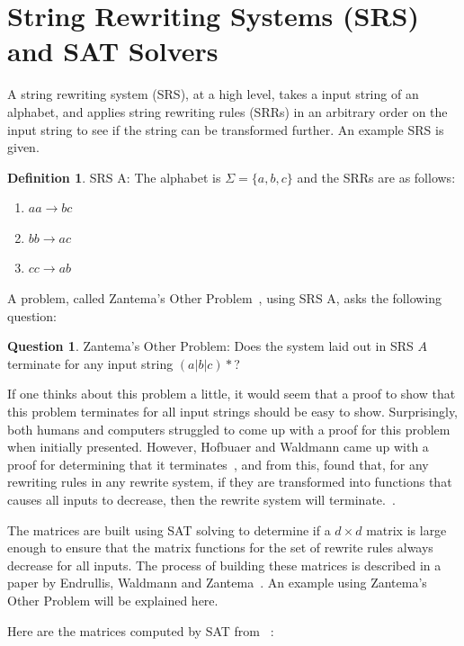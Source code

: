 \documentclass[12pt]{article}
\theoremstyle{definition}
\newtheorem{definition}{Definition}[section]
\newtheorem{question}{Question}[section]
\begin{document}
\section{String Rewriting Systems (SRS) and SAT Solvers} \label{sec:SRSandSAT}
A string rewriting system (SRS), at a high level, takes a input string of an alphabet, and applies string rewriting rules (SRRs) in an arbitrary order on the input string to see if the string can be transformed further. An example SRS is given.
\begin{definition}{SRS A:} 
The alphabet is $\Sigma = \{a, b, c\}$ and the SRRs are as follows:
\begin{enumerate}
    \item $aa \rightarrow bc$
    \item $bb \rightarrow ac$
    \item $cc \rightarrow ab$
\end{enumerate}
\end{definition}
A problem, called Zantema's Other Problem~\cite{Hofbauer:2006:TA:1142725.1711178}, using SRS A, asks the following question:\par\noindent
\begin{question}{Zantema's Other Problem:}
Does the system laid out in SRS $A$ terminate for any input string $(a|b|c)*$?
\end{question}
If one thinks about this problem a little, it would seem that a proof to show that this problem terminates for all input strings should be easy to show.  Surprisingly, both humans and computers struggled to come up with a proof for this problem when initially presented.  However, Hofbuaer and Waldmann came up with a proof for determining that it terminates~\cite{Hofbauer:2006:TA:1142725.1711178}, and from this, found that, for any rewriting rules in any rewrite system, if they are transformed into functions that causes all inputs to decrease, then the rewrite system will terminate.~\cite{Hofbauer2006}. \par
The matrices are built using SAT solving to determine if a $d \times d$ matrix is large enough to ensure that the matrix functions for the set of rewrite rules always decrease for all inputs. The process of building these matrices is described in a paper by Endrullis, Waldmann and Zantema~\cite{Endrullis2006}. An example using Zantema's Other Problem will be explained here.\par
Here are the matrices computed by SAT from ~\cite{Hofbauer:2006:TA:1142725.1711178}:
\end{document}
